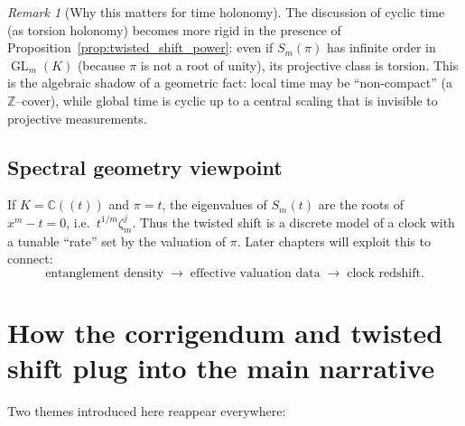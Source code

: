 \documentclass[11pt,oneside]{amsbook}
\numberwithin{equation}{section}
\theoremstyle{plain}
\theoremstyle{definition}
\theoremstyle{remark}
\newtheorem{remark}[theorem]{Remark}
\newcommand{\Z}{\mathbb{Z}}
\newcommand{\C}{\mathbb{C}}
\DeclareMathOperator{\GL}{\mathrm{GL}}
\begin{document}
\begin{remark}[Why this matters for time holonomy]
The  discussion of cyclic time (as torsion holonomy) becomes more rigid in the presence of Proposition~\ref{prop:twisted_shift_power}:
even if $S_m(\pi)$ has infinite order in $\GL_m(K)$ (because $\pi$ is not a root of unity), its projective class is torsion.
This is the algebraic shadow of a geometric fact: local time may be ``non-compact'' (a $\Z$--cover), while global time is cyclic up to a central scaling that is invisible to projective measurements.
\end{remark}

\subsection{Spectral geometry viewpoint}
If $K=\C((t))$ and $\pi=t$, the eigenvalues of $S_m(t)$ are the roots of $x^m-t=0$,
i.e.\ $t^{1/m}\zeta_m^j$.
Thus the twisted shift is a discrete model of a clock with a tunable ``rate'' set by the valuation of $\pi$.
Later chapters will exploit this to connect:
\[
\text{entanglement density} \;\longrightarrow\; \text{effective valuation data} \;\longrightarrow\; \text{clock redshift}.
\]

\section{How the corrigendum and twisted shift plug into the main narrative}
\label{sec:corrigendum_plug_in}

Two themes introduced here reappear everywhere:
\end{document}
